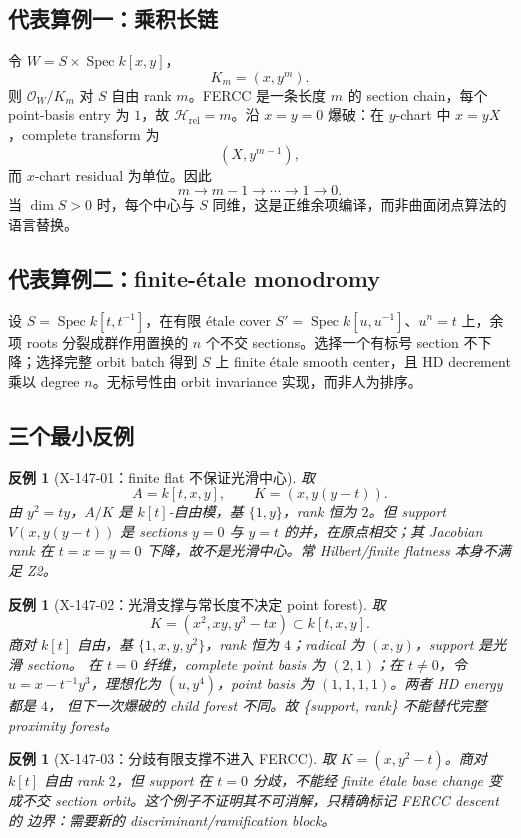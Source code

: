 \documentclass[11pt,a4paper,fontset=fandol]{ctexart}
\newtheorem{counterexample}[theorem]{反例}
\newcommand{\Hrel}{\mathscr H_{\mathrm{rel}}}
\newcommand{\cO}{\mathcal O}
\begin{document}
\subsection{代表算例一：乘积长链}
令 $W=S\times\operatorname{Spec}k[x,y]$，
\[
K_m=(x,y^m).
\]
则 $\cO_W/K_m$ 对 $S$ 自由 rank $m$。FERCC 是一条长度 $m$ 的 section chain，每个 point-basis
entry 为 $1$，故 $\Hrel=m$。沿 $x=y=0$ 爆破：在 $y$-chart 中 $x=yX$，complete transform 为
\[
(X,y^{m-1}),
\]
而 $x$-chart residual 为单位。因此
\[
m\longrightarrow m-1\longrightarrow\cdots\longrightarrow1\longrightarrow0.
\]
当 $\dim S>0$ 时，每个中心与 $S$ 同维，这是正维余项编译，而非曲面闭点算法的语言替换。

\subsection{代表算例二：finite-étale monodromy}
设 $S=\operatorname{Spec}k[t,t^{-1}]$，在有限 étale cover
$S'=\operatorname{Spec}k[u,u^{-1}]$、$u^n=t$ 上，余项 roots 分裂成群作用置换的 $n$ 个不交
sections。选择一个有标号 section 不下降；选择完整 orbit batch 得到 $S$ 上 finite étale smooth
center，且 HD decrement 乘以 degree $n$。无标号性由 orbit invariance 实现，而非人为排序。

\subsection{三个最小反例}
\begin{counterexample}[X-147-01：finite flat 不保证光滑中心]
取
\[
A=k[t,x,y],\qquad K=(x,y(y-t)).
\]
由 $y^2=ty$，$A/K$ 是 $k[t]$-自由模，基 $\{1,y\}$，rank 恒为 $2$。但 support
$V(x,y(y-t))$ 是 sections $y=0$ 与 $y=t$ 的并，在原点相交；其 Jacobian rank 在
$t=x=y=0$ 下降，故不是光滑中心。常 Hilbert/finite flatness 本身不满足 Z2。
\end{counterexample}

\begin{counterexample}[X-147-02：光滑支撑与常长度不决定 point forest]
取
\[
K=(x^2,xy,y^3-tx)\subset k[t,x,y].
\]
商对 $k[t]$ 自由，基 $\{1,x,y,y^2\}$，rank 恒为 $4$；radical 为 $(x,y)$，support 是光滑 section。
在 $t=0$ 纤维，complete point basis 为 $(2,1)$；在 $t\ne0$，令
$u=x-t^{-1}y^3$，理想化为 $(u,y^4)$，point basis 为 $(1,1,1,1)$。两者 HD energy 都是 $4$，
但下一次爆破的 child forest 不同。故 \{support, rank\} 不能替代完整 proximity forest。
\end{counterexample}

\begin{counterexample}[X-147-03：分歧有限支撑不进入 FERCC]
取 $K=(x,y^2-t)$。商对 $k[t]$ 自由 rank $2$，但 support 在 $t=0$ 分歧，不能经 finite étale
base change 变成不交 section orbit。这个例子不证明其不可消解，只精确标记 FERCC descent 的
边界：需要新的 discriminant/ramification block。
\end{counterexample}
\end{document}
